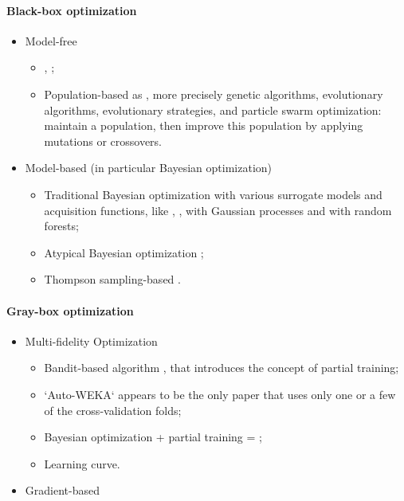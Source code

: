 \paragraph{Black-box optimization}

\begin{itemize}
    \item Model-free
    \begin{itemize}
        \item \Random, \Grid;
        \item Population-based as \CMAES, more precisely genetic algorithms, evolutionary algorithms, evolutionary strategies, and particle swarm optimization: maintain a population, then improve this population by applying mutations or crossovers.
    \end{itemize}
    \item Model-based (in particular Bayesian optimization)
    \begin{itemize}
        \item Traditional Bayesian optimization with various surrogate models and acquisition functions, like \GPUCB, \PI, \EI with Gaussian processes and \SMAC with random forests; 
        \item Atypical Bayesian optimization \TPE;
        \item Thompson sampling-based \DTTTS.
    \end{itemize}
\end{itemize}

\paragraph{Gray-box optimization}

\begin{itemize}
    \item Multi-fidelity Optimization
    \begin{itemize}
        \item Bandit-based algorithm \Hyperband, that introduces the concept of partial training;
        \item `Auto-WEKA` appears to be the only paper that uses only one or a few of the cross-validation folds;
        \item Bayesian optimization + partial training = \BOHB;
        \item Learning curve.
    \end{itemize}
    \item Gradient-based
\end{itemize}

